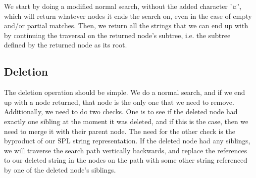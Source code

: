\documentclass[essay]{fer}
\begin{document}
We start by doing a modified normal search, without the added character '¤', which will return whatever nodes it ends the search on, even in the case of empty and/or partial matches. Then, we return all the strings that we can end up with by continuing the traversal on the returned node's subtree, i.e. the subtree defined by the returned node as its root.

\subsection{Deletion}

The deletion operation should be simple. We do a normal search, and if we end up with a node returned, that node is the only one that we need to remove. Additionally, we need to do two checks. One is to see if the deleted node had exactly one sibling at the moment it was deleted, and if this is the case, then we need to merge it with their parent node. The need for the other check is the byproduct of our SPL string representation. If the deleted node had any siblings, we will traverse the search path vertically backwards, and replace the references to our deleted string in the nodes on the path with some other string referenced by one of the deleted node's siblings.
\end{document}
